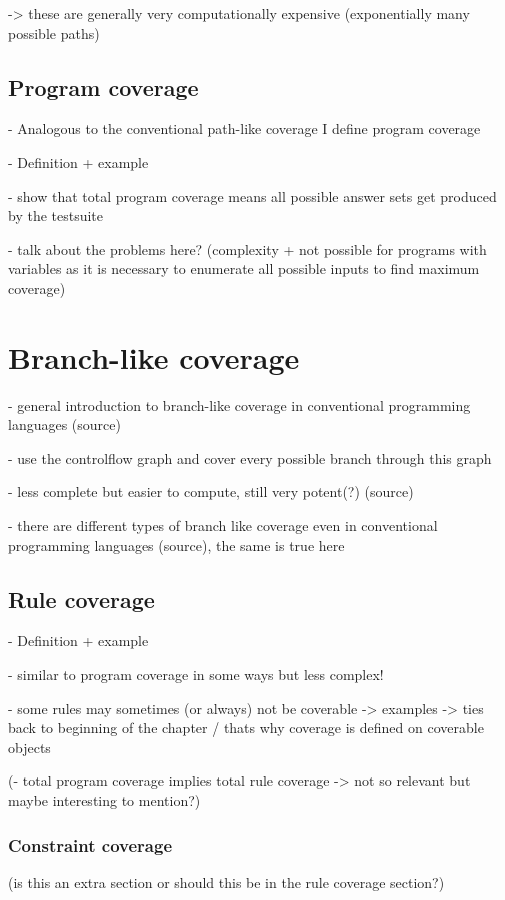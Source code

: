 -> these are generally very computationally expensive (exponentially many possible paths)

\subsection{Program coverage}
\label{subsec:Coverage metrics/Path-like coverage/Program coverage}
- Analogous to the conventional path-like coverage I define program coverage

- Definition + example

- show that total program coverage means all possible answer sets get produced by the testsuite

- talk about the problems here? (complexity + not possible for programs with variables as it is necessary to enumerate all 
possible inputs to find maximum coverage)

\section{Branch-like coverage}
\label{sec:Coverage metrics/Branch-like coverage}
- general introduction to branch-like coverage in conventional programming languages (source)

    - use the controlflow graph and cover every possible branch through this graph

- less complete but easier to compute, still very potent(?) (source)

- there are different types of branch like coverage even in conventional programming languages (source), the same is true here

\subsection{Rule coverage}
\label{subsec:Coverage metrics/Branch-like coverage/Rule coverage}
- Definition + example

- similar to program coverage in some ways but less complex!

- some rules may sometimes (or always) not be coverable -> examples -> ties back to beginning of the chapter / thats why coverage 
is defined on coverable objects

(- total program coverage implies total rule coverage -> not so relevant but maybe interesting to mention?)

\subsubsection{Constraint coverage}
\label{subsubsec:Coverage metrics/Branch-like coverage/Rule coverage/Constraint coverage}
(is this an extra section or should this be in the rule coverage section?)

